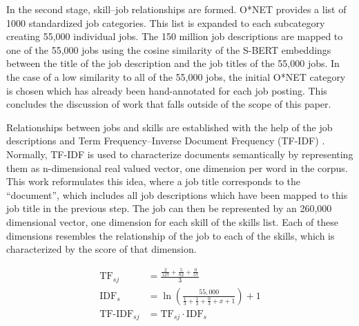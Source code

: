 In the second stage, skill–job relationships are formed. O*NET \parencite{onetonline} provides a list of 1000 standardized job categories. This list is expanded to each subcategory creating 55,000 individual jobs. The 150 million job descriptions are mapped to one of the 55,000 jobs using the cosine similarity of the S-BERT embeddings \parencite{Reimers2019SentenceBERTSE} between the title of the job description and the job titles of the 55,000 jobs. In the case of a low similarity to all of the 55,000 jobs, the initial O*NET category is chosen which has already been hand-annotated for each job posting. This concludes the discussion of work that falls outside of the scope of this paper. 


Relationships between jobs and skills are established with the help of the job descriptions and Term Frequency–Inverse Document Frequency (TF-IDF) \parencite{tfidf}.  Normally, TF-IDF is used to characterize documents semantically by representing them as n-dimensional real valued vector, one dimension per word in the corpus. This work reformulates this idea, where a job title corresponds to the “document”, which includes all job descriptions which have been  mapped to this job title in the previous step. The job can then be represented by an 260,000 dimensional vector, one dimension for each skill of the skills list. Each of these dimensions resembles the relationship of the job to each of the skills, which is characterized by the score of that dimension. 




\begin{equation}
\begin{aligned}
\text{TF}_{sj} &= \frac{\frac{2}{127}+\frac{5}{82}+\frac{0}{57}}{3}\\
\text{IDF}_{s} &= \ln\left(\frac{55,000}{\frac{1}{3}+\frac{1}{3}+\frac{0}{3}+x+1}\right) + 1\\
\text{TF-IDF}_{sj} &= \text{TF}_{sj} \cdot \text{IDF}_{s} \label{eq:tfidf}
\end{aligned}
\end{equation}



